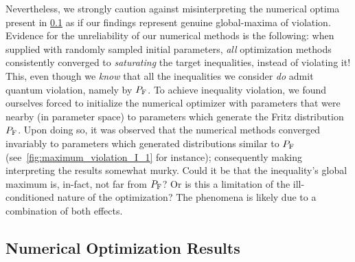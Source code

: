 \documentclass[aps, 10pt, english, twoside, pra, nofootinbib, tightenlines, longbibliography, superscriptaddress]{revtex4-1}
\begin{document}
    Nevertheless, we strongly caution against misinterpreting the numerical optima present in \cref{sec:optima} as if our findings represent genuine global-maxima of violation. Evidence for the unreliability of our numerical methods is the following: when supplied with randomly sampled initial parameters, \emph{all} optimization methods consistently converged to \emph{saturating} the target inequalities, instead of violating it! This, even though we \emph{know} that all the inequalities we consider \emph{do} admit quantum violation, namely by  $\prob[\fritz]$. To achieve inequality violation, we found ourselves forced to initialize the numerical optimizer with parameters that were nearby (in parameter space) to parameters which generate the Fritz distribution $\prob[\fritz]$. Upon doing so, it was observed that the numerical methods converged invariably to parameters which generated distributions similar to $\prob[\fritz]$ (see~\cref{fig:maximum_violation_I_1} for instance); consequently making interpreting the results somewhat murky. Could it be that the inequality's global maximum is, in-fact, not far from $\prob[\fritz]$? Or is this a limitation of the ill-conditioned nature of the optimization? The phenomena is likely due to a combination of both effects.

    \subsection{Numerical Optimization Results}\label{sec:optima}
\end{document}
